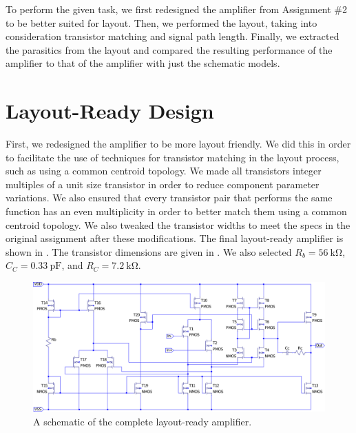 \documentclass[journal,hidelinks]{IEEEtran}
\begin{document}
To perform the given task, we first redesigned the amplifier from Assignment \#2 to be better suited for layout. Then, we performed the layout, taking into consideration transistor matching and signal path length. Finally, we extracted the parasitics from the layout and compared the resulting performance of the amplifier to that of the amplifier with just the schematic models.

\section{Layout-Ready Design}

First, we redesigned the amplifier to be more layout friendly. We did this in order to facilitate the use of techniques for transistor matching in the layout process, such as using a common centroid topology. We made all transistors integer multiples of a unit size transistor in order to reduce component parameter variations. We also ensured that every transistor pair that performs the same function has an even multiplicity in order to better match them using a common centroid topology. We also tweaked the transistor widths to meet the specs in the original assignment after these modifications. The final layout-ready amplifier is shown in . The transistor dimensions are given in . We also selected $R_b = \SI{56}{\kilo\ohm}$, $C_C = \SI{0.33}{\pico\farad}$, and $R_C = \SI{7.2}{\kilo\ohm}$.

\begin{figure}[!htb]
  \centering
  \includegraphics[width=\textwidth]{schematics/amplifier.pdf}
  \caption{A schematic of the complete layout-ready amplifier.}
  \label{fig:amplifier}
\end{figure}

\begin{table}[!htb]
  \centering
  \caption{Final transistor dimensions (Part 1).}
  \label{tab:dim-final-1}
\end{table}
\end{document}
